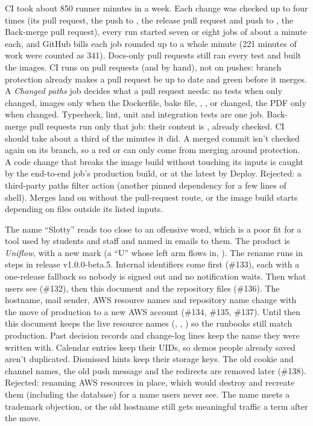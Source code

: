   {CI took about 850 runner minutes in a week. Each change was checked up to four times (its pull
   request, the push to , the release pull request and push to , the
   Back-merge pull request), every run started seven or eight jobs of about a minute each, and
   GitHub bills each job rounded up to a whole minute (221 minutes of work were counted as 341).
   Docs-only pull requests still ran every test and built the images.}
  {CI runs on pull requests (and by hand), not on pushes: branch protection already makes a pull
   request be up to date and green before it merges. A \emph{Changed paths} job decides what a pull
   request needs: no tests when only  changed, images only when the Dockerfile, bake
   file, , ,  or  changed, the PDF only
   when  changed. Typecheck, lint, unit and integration tests are one job. Back-merge
   pull requests run only that job: their content is , already checked.}
  {CI should take about a third of the minutes it did. A merged commit isn't checked again on its branch, so a red
    or  can only come from merging around protection. A code change that
   breaks the image build without touching its inputs is caught by the end-to-end job's production
   build, or at the latest by Deploy. Rejected: a third-party paths filter action (another pinned
   dependency for a few lines of shell).}
  {Merges land on  without the pull-request route, or the image build starts depending on
   files outside its listed inputs.}

  {The name ``Slotty'' reads too close to an offensive word, which is a poor fit for a tool used
   by students and staff and named in emails to them.}
  {The product is \emph{Uniflow}, with a new mark (a ``U'' whose left arm flows in, ).
   The rename runs in steps in release v1.0.0-beta.5. Internal identifiers come first (\#133), each
   with a one-release fallback so nobody is signed out and no notification waits. Then what users see
   (\#132), then this document and the repository files (\#136). The hostname, mail sender,
   AWS resource names and repository name change with the move of production to a new AWS account
   (\#134, \#135, \#137). Until then this document keeps the live resource names
   (, , ) so the runbooks still
   match production. Past decision records and change-log lines keep the name they were written with.}
  {Calendar entries keep their  UIDs, so demos people already saved aren't duplicated.
   Dismissed hints keep their storage keys. The old cookie and channel names, the old push message
   and the  redirects are removed later (\#138). Rejected: renaming AWS resources
   in place, which would destroy and recreate them (including the database) for a name users never see.}
  {The name meets a trademark objection, or the old hostname still gets meaningful traffic a term after the move.}

